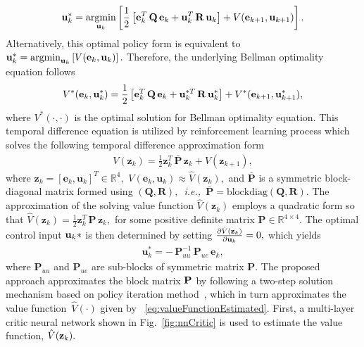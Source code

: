 \documentclass[conference]{IEEEtran}
\DeclareMathOperator*{\argmin}{arg min}
\begin{document}
 \begin{align*}
 {\bf u}^*_k = \argmin_{{\bf u}_k}\left[\frac{1}{2}\left[{\bf e}^T_k\,  {\bf Q}\, {\bf e}_k +{\bf u}^T_k\,  {\bf R} \,  {\bf u}_k\right]   +
 V({\bf e}_{k+1},{\bf u}_{k+1})\right].
 \label{eq:argMinControlAction}
 \end{align*}
 Alternatively, this optimal  policy form is equivalent to ${\bf u}^*_k = \argmin_{{\bf u}_k}\left[
 V({\bf e}_{k},{\bf u}_{k})\right].$ 
 Therefore, the underlying Bellman optimality equation follows %
 \begin{equation*}
 \label{eq:BellOpt}
 V^*({\bf e}_k,{\bf u}^*_k)= \frac{1}{2}\left[{\bf e}_k^T\, {\bf Q}\, {\bf e}_k + {\bf u}_k^{*T}\, {\bf R}\, {\bf u}^*_k\right] +V^*({\bf e}_{k+1},{\bf u}^*_{k+1}),
 \end{equation*}
 where $V^*(\cdot,\cdot)$ is the optimal solution for Bellman optimality equation. This temporal difference equation is utilized by reinforcement learning process which solves the following temporal difference approximation form %
 \begin{align}
   V(\mathbf{z}_k) = \frac{1}{2}\mathbf{z}_k^T\, \bar{\mathbf{P}}\, \mathbf{z}_k + V(\mathbf{z}_{k+1}),
 \label{eq:valueFunctionEstimated}
 \end{align}
 where $\mathbf{z}_k = \left[\mathbf{e}_k ,\mathbf{u}_k\right]^T\in\mathbb{R}^4,$ $V\left(\mathbf{e}_k,\mathbf{u}_k\right) \approx \hat{V}(\mathbf{z}_k),$  and $\bar{\mathbf{P}}$ is a symmetric block-diagonal matrix formed using $(\mathbf{Q},\mathbf{R}),$~\textit{i.e.,~}$\bar{\mathbf{P}} = \mathrm{blockdiag}(\mathbf{Q},\mathbf{R}).$ %
 The approximation of the solving value function $\hat{V}(\mathbf{z}_k)$ employs a quadratic form so that $\hat{V}(\mathbf{z}_k)=\frac{1}{2}\mathbf{z}_k^T\, \mathbf{P}\, \mathbf{z}_k,$ for some positive definite matrix  $\mathbf{P}\in\mathbb{R}^{4\times 4}.$ The optimal control input ${\bf u}_k*$ is then determined by setting $\frac{\partial\hat{V}({\bf z}_k)}{\partial{\bf u}_k} = 0,$ which yields %
 \begin{align}
 \label{eq:modelFreePolicy}    
 \mathbf{u}_k^* = -\,  \mathbf{P}_{uu}^{-1}\, \mathbf{P}_{ue}\, \mathbf{e}_k,
 \end{align}
 where $\mathbf{P}_{uu}$ and $\mathbf{P}_{ue}$ are sub-blocks of symmetric matrix $\mathbf{P}.$ The proposed approach approximates the block matrix ${\bf P}$ by following a two-step solution mechanism based on policy iteration method~\cite{sutton2020reinforcement}, which in turn approximates the value function~$\hat V(\cdot)$ given by ~\eqref{eq:valueFunctionEstimated}. First, a multi-layer critic neural network shown in Fig.~\ref{fig:nnCritic} is used to estimate the value function, $\hat V({\bf z}_k).$ 
\end{document}
